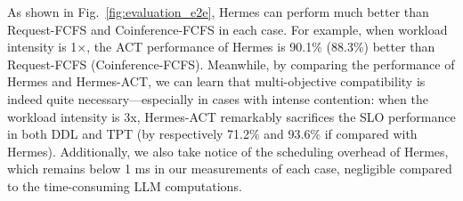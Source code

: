 
As shown in Fig.~\ref{fig:evaluation_e2e}, Hermes can perform much better than Request-FCFS and Coinference-FCFS in each case.
For example, when workload intensity is 1$\times$, the ACT performance of Hermes is 90.1\% (88.3\%) better than  Request-FCFS (Coinference-FCFS). 
Meanwhile, by comparing the performance of Hermes and Hermes-ACT, we can learn that multi-objective compatibility is indeed quite necessary---especially in cases with intense contention: 
when the workload intensity is 3x, Hermes-ACT remarkably sacrifices the SLO performance in both DDL and TPT (by respectively 71.2\% and 93.6\% if compared with Hermes). 
Additionally, we also take notice of the scheduling overhead of Hermes, which remains below 1 ms in our measurements of each case, negligible compared to the time-consuming LLM computations. %


